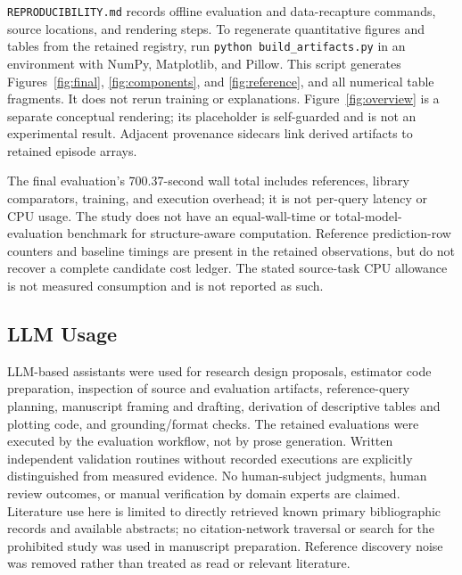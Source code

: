 \documentclass{article}
\begin{document}
\texttt{REPRODUCIBILITY.md} records offline evaluation and data-recapture commands, source locations, and rendering steps. To regenerate quantitative figures and tables from the retained registry, run \texttt{python build\_artifacts.py} in an environment with NumPy, Matplotlib, and Pillow. This script generates Figures~\ref{fig:final}, \ref{fig:components}, and \ref{fig:reference}, and all numerical table fragments. It does not rerun training or explanations. Figure~\ref{fig:overview} is a separate conceptual rendering; its placeholder is self-guarded and is not an experimental result. Adjacent provenance sidecars link derived artifacts to retained episode arrays.

The final evaluation's 700.37-second wall total includes references, library comparators, training, and execution overhead; it is not per-query latency or CPU usage. The study does not have an equal-wall-time or total-model-evaluation benchmark for structure-aware computation. Reference prediction-row counters and baseline timings are present in the retained observations, but do not recover a complete candidate cost ledger. The stated source-task CPU allowance is not measured consumption and is not reported as such.

\subsection{LLM Usage}
LLM-based assistants were used for research design proposals, estimator code preparation, inspection of source and evaluation artifacts, reference-query planning, manuscript framing and drafting, derivation of descriptive tables and plotting code, and grounding/format checks. The retained evaluations were executed by the evaluation workflow, not by prose generation. Written independent validation routines without recorded executions are explicitly distinguished from measured evidence. No human-subject judgments, human review outcomes, or manual verification by domain experts are claimed. Literature use here is limited to directly retrieved known primary bibliographic records and available abstracts; no citation-network traversal or search for the prohibited study was used in manuscript preparation. Reference discovery noise was removed rather than treated as read or relevant literature.
\end{document}
